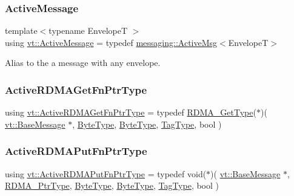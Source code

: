 \mbox{\label{namespacevt_a00eb67bd138395b6a4f744fab3fa0678}} 
\subsubsection{\texorpdfstring{Active\+Message}{ActiveMessage}}
{\footnotesize\ttfamily template$<$typename EnvelopeT $>$ \\
using \hyperlink{namespacevt_a00eb67bd138395b6a4f744fab3fa0678}{vt\+::\+Active\+Message} = typedef \hyperlink{structvt_1_1messaging_1_1_active_msg}{messaging\+::\+Active\+Msg}$<$EnvelopeT$>$}



Alias to the a message with any envelope. 

\mbox{\label{namespacevt_ae4fbf97da623bfcd09ee8379de756257}} 
\subsubsection{\texorpdfstring{Active\+R\+D\+M\+A\+Get\+Fn\+Ptr\+Type}{ActiveRDMAGetFnPtrType}}
{\footnotesize\ttfamily using \hyperlink{namespacevt_ae4fbf97da623bfcd09ee8379de756257}{vt\+::\+Active\+R\+D\+M\+A\+Get\+Fn\+Ptr\+Type} = typedef \hyperlink{namespacevt_a1cab7f4860f65a49ad2c042d6240f288}{R\+D\+M\+A\+\_\+\+Get\+Type}($\ast$)( \hyperlink{namespacevt_ac34f95a5e2b8109b55bfba52b074443d}{vt\+::\+Base\+Message} $\ast$, \hyperlink{namespacevt_aab8d55968084610ce3b17057981e9300}{Byte\+Type}, \hyperlink{namespacevt_aab8d55968084610ce3b17057981e9300}{Byte\+Type}, \hyperlink{namespacevt_a84ab281dae04a52a4b243d6bf62d0e52}{Tag\+Type}, bool )}

\mbox{\label{namespacevt_a23220eaaee4345f7371d35e3aee23c70}} 
\subsubsection{\texorpdfstring{Active\+R\+D\+M\+A\+Put\+Fn\+Ptr\+Type}{ActiveRDMAPutFnPtrType}}
{\footnotesize\ttfamily using \hyperlink{namespacevt_a23220eaaee4345f7371d35e3aee23c70}{vt\+::\+Active\+R\+D\+M\+A\+Put\+Fn\+Ptr\+Type} = typedef void($\ast$)( \hyperlink{namespacevt_ac34f95a5e2b8109b55bfba52b074443d}{vt\+::\+Base\+Message} $\ast$, \hyperlink{namespacevt_a9e2c953286c7616f7c218e9951790776}{R\+D\+M\+A\+\_\+\+Ptr\+Type}, \hyperlink{namespacevt_aab8d55968084610ce3b17057981e9300}{Byte\+Type}, \hyperlink{namespacevt_aab8d55968084610ce3b17057981e9300}{Byte\+Type}, \hyperlink{namespacevt_a84ab281dae04a52a4b243d6bf62d0e52}{Tag\+Type}, bool )}

